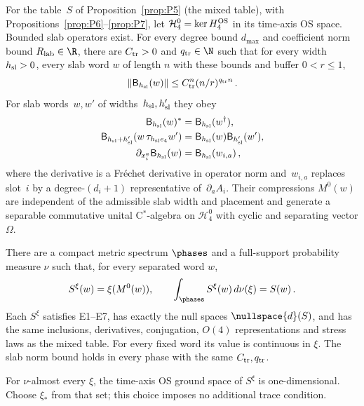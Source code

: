 \begin{proposition}\label{prop:P8}
For the table~$S$ of Proposition~\ref{prop:P5} (the mixed table), with Propositions~\ref{prop:P6}--\ref{prop:P7}, let $\mathcal H^0_4=\ker H^{\rm OS}_4$ in its time-axis OS space. Bounded slab operators exist. For every degree bound $d_{\max}$ and coefficient norm bound $R_{\rm lab}\in\R$, there are $C_{\rm tr}>0$ and $q_{\rm tr}\in\N$ such that for every width $h_{\rm sl}>0$, every slab word $w$ of length $n$ with these bounds and buffer $0<r\le1$,
\begin{equation}\label{eq:P8-1}
\|\mathsf B_{h_{\rm sl}}(w)\|\le C_{\rm tr}^n(n/r)^{q_{\rm tr}n}\,.
\end{equation}
For slab words~$w,w'$ of widths~$h_{\rm sl},h'_{\rm sl}$ they obey
\begin{equation}\label{eq:P8-laws}
\begin{aligned}
\mathsf B_{h_{\rm sl}}(w)^*&=\mathsf B_{h_{\rm sl}}(w^\dagger),\\
\mathsf B_{h_{\rm sl}+h'_{\rm sl}}(w\,\tau_{h_{\rm sl}e_4}w')&=\mathsf B_{h_{\rm sl}}(w)\mathsf B_{h'_{\rm sl}}(w'),\\
\partial_{x_i^a}\mathsf B_{h_{\rm sl}}(w)&=\mathsf B_{h_{\rm sl}}(w_{i,a})\,,
\end{aligned}
\end{equation}
where the derivative is a Fr\'echet derivative in operator norm and~$w_{i,a}$ replaces slot~$i$ by a degree-$(d_i+1)$ representative of~$\partial_aA_i$. Their compressions $M^0(w)$ are independent of the admissible slab width and placement and generate a separable commutative unital C$^*$-algebra on $\mathcal H^0_4$ with cyclic and separating vector $\Omega$.

There are a compact metric spectrum $\phases$ and a full-support probability measure $\nu$ such that, for every separated word $w$,
\begin{equation}\label{eq:P8-2}
S^\xi(w)=\xi(M^0(w)),\qquad \int_{\phases} S^\xi(w)\,d\nu(\xi)=S(w)\,.
\end{equation}
Each $S^\xi$ satisfies E1–E7, has exactly the null spaces $\nullspace{d}(S)$, and has the same inclusions, derivatives, conjugation, $O(4)$ representations and stress laws as the mixed table. For every fixed word its value is continuous in $\xi$. The slab norm bound holds in every phase with the same $C_{\rm tr},q_{\rm tr}$.

For $\nu$-almost every $\xi$, the time-axis OS ground space of $S^\xi$ is one-dimensional. Choose $\xi_*$ from that set; this choice imposes no additional trace condition.
\end{proposition}

